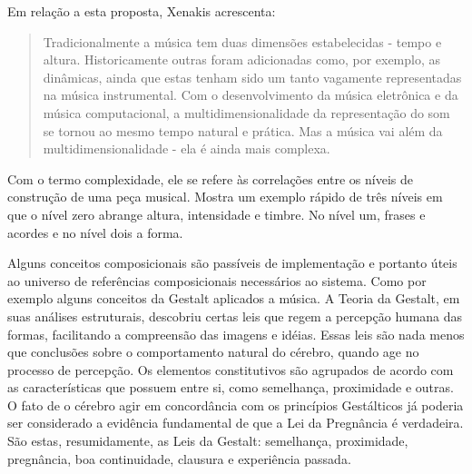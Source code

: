 \documentclass[draft]{ppgmus}
\begin{document}
Em relação a esta proposta, Xenakis acrescenta: 

\begin{quote}
Tradicionalmente a música tem duas dimensões estabelecidas - tempo e
altura. Historicamente outras foram adicionadas como, por exemplo, as
dinâmicas, ainda que estas tenham sido um tanto vagamente
representadas na música instrumental. Com o desenvolvimento da música
eletrônica e da música computacional, a multidimensionalidade da
representação do som se tornou ao mesmo tempo natural e prática. Mas a
música vai além da multidimensionalidade - ela é ainda mais complexa. \cite{xenakis96:determinacy}
  
\end{quote} 

Com o termo complexidade, ele se refere às correlações entre os níveis
de construção de uma peça musical. Mostra um exemplo rápido de três
níveis em que o nível zero abrange altura, intensidade e timbre. No
nível um, frases e acordes e no nível dois a forma.

Alguns conceitos composicionais são passíveis de implementação e portanto úteis 
ao universo de referências composicionais necessários ao sistema. Como por exemplo 
alguns conceitos da Gestalt aplicados a música. A Teoria da Gestalt, em suas análises estruturais, 
descobriu certas leis que regem a
percepção humana das formas, facilitando a compreensão das imagens e idéias. Essas leis são
nada menos que conclusões sobre o comportamento natural do cérebro, quando age no
processo de percepção. Os elementos constitutivos são agrupados de acordo com as
características que possuem entre si, como semelhança, proximidade e outras. O fato de o cérebro agir 
em concordância com os princípios Gestálticos já poderia ser
considerado a evidência fundamental de que a Lei da Pregnância é verdadeira. São estas,
resumidamente, as Leis da Gestalt: semelhança, proximidade, pregnância, boa continuidade, clausura e 
experiência passada.
\end{document}
